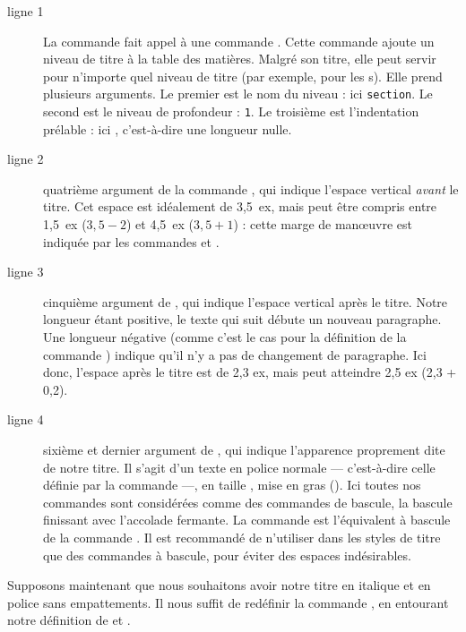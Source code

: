 \begin{description}
\item[ligne 1]La commande  fait appel à une commande . Cette commande ajoute  un niveau de titre à la table des matières. Malgré son titre, elle peut servir pour n'importe quel niveau de titre (par exemple, pour les s). Elle prend plusieurs arguments. Le premier est le nom du niveau : ici \verb|section|. Le second est le niveau de profondeur : \verb|1|. Le troisième est l'indentation prélable : ici , c'est-à-dire une longueur nulle.

\item[ligne 2] quatrième argument de la commande , qui indique l'espace vertical \emph{avant} le titre. Cet espace est idéalement de 3,5~ex, mais peut être compris entre 1,5~ex ($3,5 - 2$) et 4,5~ex ($3,5 + 1$) :  cette marge de manœuvre est indiquée par les commandes   et .
\item[ligne 3] cinquième argument de , qui indique l'espace vertical après le titre. Notre longueur étant positive, le texte qui suit débute un nouveau paragraphe. Une longueur négative (comme c'est le cas pour la définition de la commande ) indique qu'il n'y a pas de changement de paragraphe. Ici donc, l'espace après le titre est de 2,3 ex, mais peut atteindre 2,5 ex (2,3 + 0,2).
\item[ligne 4] sixième et dernier argument de , qui indique l'apparence proprement dite de notre titre. Il s'agit d'un texte en police normale --- c'est-à-dire celle définie par la commande  ---, en taille , mise en gras (). Ici toutes nos commandes sont considérées comme des commandes de bascule, la bascule finissant avec l'accolade fermante. La commande  est l'équivalent à bascule de la commande . Il est recommandé de n'utiliser dans les styles de titre que des commandes à bascule, pour éviter des espaces indésirables.\label{bfseries}
\end{description}

Supposons maintenant que nous souhaitons avoir notre titre en italique et en police sans empattements. Il nous suffit de redéfinir la commande , en entourant notre définition de  et .

\begin{latexcode}
\makeatletter
\renewcommand\section{\@startsection {section}{1}{\z@}%
                             {-3.5ex \@plus -1ex \@minus -.2ex}%
                             {2.3ex \@plus.2ex}%
                             {\sffamily\Large\itshape}}
\makeatother
\end{latexcode}

